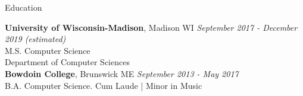 \documentclass{resume} %
\begin{document}

\begin{rSection}{Education}

{\bf University of Wisconsin-Madison}, Madison WI \hfill {\em September 2017 - December 2019 (estimated)}
\\ M.S. Computer Science
\\ Department of Computer Sciences\\

{\bf Bowdoin College}, Brunswick ME \hfill {\em September 2013 - May 2017}
\\ B.A. Computer Science.\hfill { Cum Laude | }
Minor in Music \smallskip \\
\end{rSection}

\end{document}
